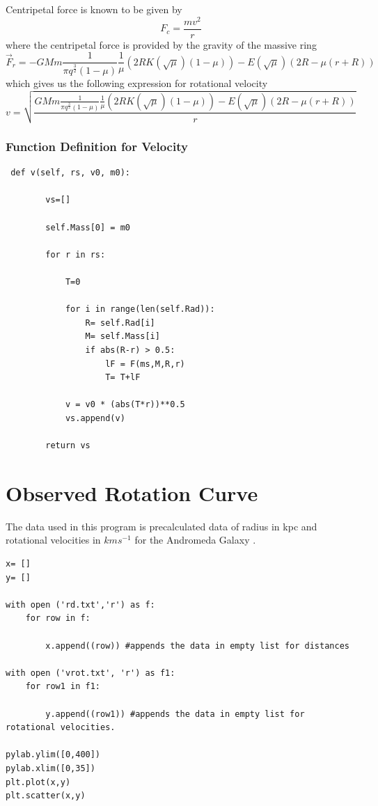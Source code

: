Centripetal force is known to be given by
\begin{equation}
F_{c} = \frac{m v^2 }{r}
\end{equation}
where the centripetal force is provided by the gravity of the massive ring
\begin{equation}
\vec{F}_{r} = - GMm \frac{1}{\pi q^ \frac{3}{2} (1- \mu)} \frac{1}{\mu} (2 R K(\sqrt{\mu}) (1 - \mu))- E (\sqrt{\mu}) (2 R - \mu (r + R))
\end{equation}
which gives us the following expression for rotational velocity
\begin{equation}
v = \sqrt{\frac{GMm \frac{1}{\pi q^ \frac{3}{2} (1- \mu)} \frac{1}{\mu} (2 R K(\sqrt{\mu}) (1 - \mu))- E (\sqrt{\mu}) (2 R - \mu (r + R))}{r}}
\end{equation}

\subsubsection{Function Definition for Velocity}
\begin{verbatim}
 def v(self, rs, v0, m0):

        vs=[]

        self.Mass[0] = m0

        for r in rs:

            T=0

            for i in range(len(self.Rad)):
                R= self.Rad[i]
                M= self.Mass[i]
                if abs(R-r) > 0.5:
                    lF = F(ms,M,R,r)
                    T= T+lF

            v = v0 * (abs(T*r))**0.5
            vs.append(v)

        return vs
\end{verbatim}

\section{Observed Rotation Curve}

The data used in this program is precalculated data of radius in kpc and rotational velocities in $kms^{-1}$ for the Andromeda Galaxy \cite{observed}.
\begin{verbatim}
x= []
y= []

with open ('rd.txt','r') as f:
    for row in f:

        x.append((row)) #appends the data in empty list for distances

with open ('vrot.txt', 'r') as f1:
    for row1 in f1:

        y.append((row1)) #appends the data in empty list for rotational velocities.

pylab.ylim([0,400])
pylab.xlim([0,35])
plt.plot(x,y)
plt.scatter(x,y)
\end{verbatim}

